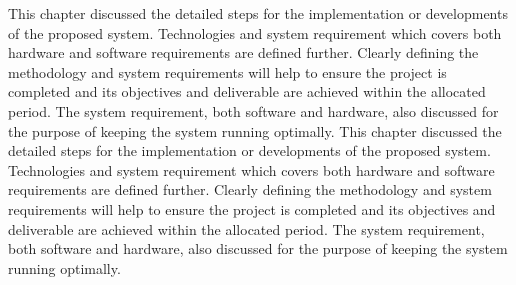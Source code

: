\documentclass[../index.tex]{subfiles}
\begin{document}
This chapter discussed the detailed steps for the implementation or developments of the proposed
system. Technologies and system requirement which covers both hardware and software requirements are
defined further. Clearly defining the methodology and system requirements will help to ensure the
project is completed and its objectives and deliverable are achieved within the allocated period.
The system requirement, both software and hardware, also discussed for the purpose of keeping the
system running optimally. This chapter discussed the detailed steps for the implementation or
developments of the proposed system. Technologies and system requirement which covers both hardware
and software requirements are defined further. Clearly defining the methodology and system
requirements will help to ensure the project is completed and its objectives and deliverable are
achieved within the allocated period. The system requirement, both software and hardware, also
discussed for the purpose of keeping the system running optimally.
\end{document}
